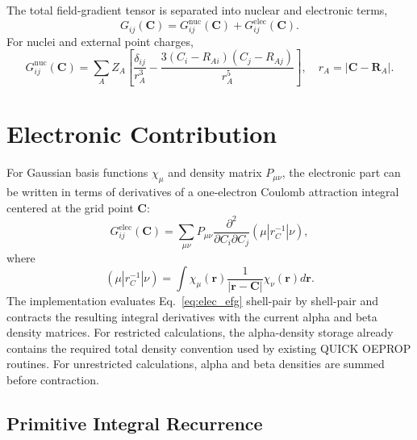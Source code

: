 \documentclass[journal=jcisd8,manuscript=article]{achemso}
\begin{document}
The total field-gradient tensor is separated into nuclear and electronic terms,
\begin{equation}
  G_{ij}(\mathbf{C}) =
  G^{\mathrm{nuc}}_{ij}(\mathbf{C}) +
  G^{\mathrm{elec}}_{ij}(\mathbf{C}).
\end{equation}
For nuclei and external point charges,
\begin{equation}
  G^{\mathrm{nuc}}_{ij}(\mathbf{C})
  =
  \sum_A Z_A
  \left[
    \frac{\delta_{ij}}{r_A^3}
    -
    \frac{3(C_i-R_{Ai})(C_j-R_{Aj})}{r_A^5}
  \right],
  \quad
  r_A = |\mathbf{C}-\mathbf{R}_A|.
  \label{eq:nuc_efg}
\end{equation}

\section{Electronic Contribution}

For Gaussian basis functions \(\chi_\mu\) and density matrix \(P_{\mu\nu}\), the electronic part can be written in terms of derivatives of a one-electron Coulomb attraction integral centered at the grid point \(\mathbf{C}\):
\begin{equation}
  G^{\mathrm{elec}}_{ij}(\mathbf{C})
  =
  \sum_{\mu\nu} P_{\mu\nu}
  \frac{\partial^2}{\partial C_i \partial C_j}
  (\mu | r_C^{-1} | \nu),
  \label{eq:elec_efg}
\end{equation}
where
\begin{equation}
  (\mu | r_C^{-1} | \nu)
  =
  \int
  \chi_\mu(\mathbf{r})
  \frac{1}{|\mathbf{r}-\mathbf{C}|}
  \chi_\nu(\mathbf{r})
  d\mathbf{r}.
\end{equation}
The implementation evaluates Eq.~\ref{eq:elec_efg} shell-pair by shell-pair and contracts the resulting integral derivatives with the current alpha and beta density matrices.  For restricted calculations, the alpha-density storage already contains the required total density convention used by existing QUICK OEPROP routines.  For unrestricted calculations, alpha and beta densities are summed before contraction.

\subsection{Primitive Integral Recurrence}
\end{document}
